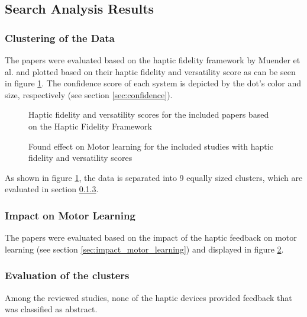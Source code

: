 \subsection{Search Analysis Results}

\subsubsection{Clustering of the Data}
The papers were evaluated based on the haptic fidelity framework by Muender et al. \cite{Muender2022HapticReality} and plotted based on their haptic fidelity and versatility score as can be seen in figure \ref{fig:fidelity_plot}. The confidence score of each system is depicted by the dot's color and size, respectively (see section \ref{sec:confidence}). 

\begin{figure}[!htbp]
\resizebox{0.99\textwidth}{!}{}
\caption{Haptic fidelity and versatility scores for the included papers based on the Haptic Fidelity Framework}
\label{fig:fidelity_plot}
\end{figure}

\begin{figure}[!htbp]
\resizebox{0.99\textwidth}{!}{}
\caption{Found effect on Motor learning for the included studies with haptic fidelity and versatility scores}
\label{fig:motorlearning_plot}
\end{figure}


As shown in figure \ref{fig:fidelity_plot}, the data is separated into 9 equally sized clusters, which are evaluated in section \ref{sec:evaluation_clusters}.


\subsubsection{Impact on Motor Learning}
The papers were evaluated based on the impact of the haptic feedback on motor learning (see section \ref{sec:impact_motor_learning}) and displayed in figure \ref{fig:motorlearning_plot}.


\subsubsection{Evaluation of the clusters}
\label{sec:evaluation_clusters}

Among the reviewed studies, none of the haptic devices provided feedback that was classified as abstract.


